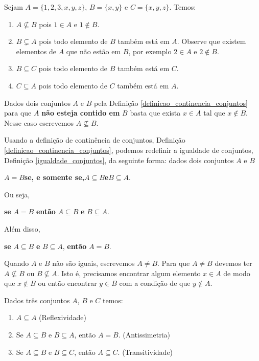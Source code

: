 \begin{exemplos}
	Sejam $A = \{1,2,3,x,y,z\}$, $B = \{x, y\}$ e $C = \{x, y , z\}$. Temos:
	\begin{enumerate}[label={\arabic*})]
		\item $A \nsubseteq B$ pois $1 \in A$ e $1 \notin B$.
		\item $B \subsetneq A$ pois todo elemento de $B$ tamb\'em est\'a em $A$. Observe que existem elementos de $A$ que n\~ao est\~ao em $B$, por exemplo $2 \in A$ e $2 \notin B$.
		\item $B \subseteq C$ pois todo elemento de $B$ tamb\'em est\'a em $C$.
		\item $C \subseteq A$ pois todo elemento de $C$ tamb\'em est\'a em $A$.
	\end{enumerate}
\end{exemplos}

\begin{observacao}
	Dados dois conjuntos $A$ e $B$ pela Defini\c{c}\~ao \ref{definicao_continencia_conjuntos} para que $A$ \textbf{n\~ao esteja contido em} $B$ basta que exista $x \in A$ tal que $x \notin B$. Nesse caso escrevemos $A \nsubseteq B$.
\end{observacao}

Usando a defini\c{c}\~ao de contin\^encia de conjuntos, Defini\c{c}\~ao \ref{definicao_continencia_conjuntos}, podemos redefinir a igualdade de conjuntos, Defini\c{c}\~ao \ref{igualdade_conjuntos}, da seguinte forma: dados dois conjuntos $A$ e $B$
\begin{center}
	$A = B$\quad \textbf{se, e somente se,}\quad $A \subseteq B$\quad \textbf{e}\quad $B \subseteq A$.
\end{center}

Ou seja,
\begin{center}
	\textbf{se} $A = B$ \textbf{ent{\~a}o} $A \subseteq B$ \textbf{e} $B \subseteq A$.
\end{center}

Al\'em disso,
\begin{center}
	\textbf{se} $A \subseteq B$ \textbf{e} $B \subseteq A$, \textbf{ent{\~a}o} $A = B$.
\end{center}

Quando $A$ e $B$ n{\~a}o s{\~a}o iguais, escrevemos $A \neq B$. Para que $A \neq B$ devemos ter $A \nsubseteq B$ ou $B \nsubseteq A$. Isto \'e, precisamos encontrar algum elemento $x \in A$ de modo que $x \notin B$ ou ent\~ao encontrar $y \in B$ com a condição de que $y \notin A$.

\begin{proposicao}
	Dados tr\^es conjuntos $A$, $B$ e $C$ temos:
	\begin{enumerate}[label={\roman*})]
		\item $A\subseteq A$ (Reflexividade)
		\item Se $A\subseteq B \mbox{ e } B\subseteq A$, ent{\~a}o $A=B$. (Antissimetria)
		\item Se $A\subseteq B$ e $B\subseteq C$, ent{\~a}o $A\subseteq C$. (Transitividade)
	\end{enumerate}
\end{proposicao}


